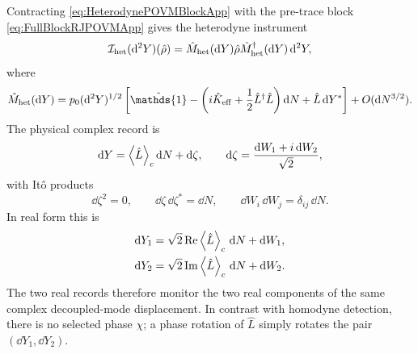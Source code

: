 \documentclass{article}
\newcommand{\openone}{\hat{\mathds{1}}}
\numberwithin{equation}{section}
\begin{document}
	Contracting \cref{eq:HeterodynePOVMBlockApp} with the pre-trace block \cref{eq:FullBlockRJPOVMApp} gives the heterodyne instrument
	\begin{equation}
		\mathcal I_{\rm het}(\dd^2 Y)(\hat\rho) = \hat M_{\rm het}(\dd Y)\hat\rho \hat M_{\rm het}^\dagger(\dd Y)\,\dd^2 Y,
		\label{eq:HeterodyneInstrumentApp}
	\end{equation}
	where
	\begin{equation}
		\hat M_{\rm het}(\dd Y) = p_0(\dd^2 Y)^{1/2} \left[ \openone - \left( i\hat K_{\rm eff} + \frac12\hat L^\dagger\hat L \right)\dd N + \hat L\,\dd Y^* \right] + O(\dd N^{3/2}).
		\label{eq:HeterodyneMeasurementOperatorApp}
	\end{equation}
	The physical complex record is
	\begin{equation}
		\dd Y = \ev{\hat L}_c \dd N + \dd \zeta, \qquad \dd \zeta=\frac{\dd W_1+i\,\dd W_2}{\sqrt2},
		\label{eq:HeterodyneRecordPOVMApp}
	\end{equation}
	with It\^o products
	\begin{equation}
		\dd \zeta^2=0, \qquad \dd \zeta\,\dd \zeta^*=\dd N, \qquad \dd W_i\,\dd W_j=\delta_{ij}\,\dd N .
	\end{equation}
	In real form this is
	\begin{align}
		\dd Y_1 &= \sqrt2\,\mathrm{Re}\ev{\hat L}_c\,\dd N + \dd W_1,
		\label{eq:HeterodyneRealRecord1App}
		\\ \dd Y_2 &= \sqrt2\,\mathrm{Im}\ev{\hat L}_c\,\dd N + \dd W_2 .
		\label{eq:HeterodyneRealRecord2App}
	\end{align}
	The two real records therefore monitor the two real components of the same complex decoupled-mode displacement. In contrast with homodyne detection, there is no selected phase \(\chi\); a phase rotation of \(\hat L\) simply rotates the pair \((\dd Y_1,\dd Y_2)\).
\end{document}
